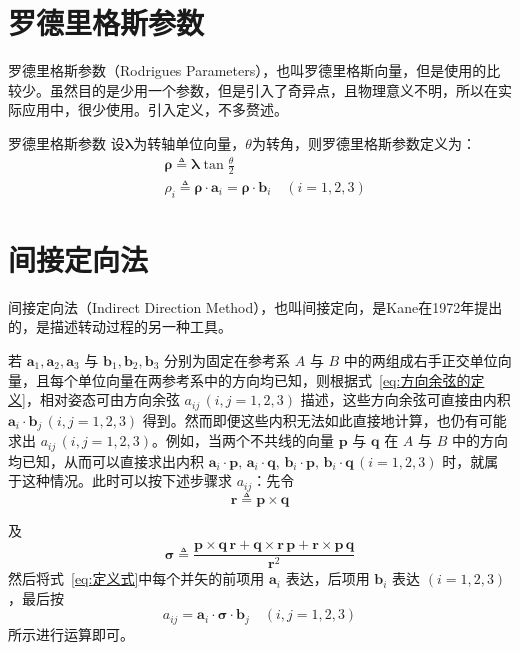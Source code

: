 \section{罗德里格斯参数}
罗德里格斯参数（Rodrigues Parameters），也叫罗德里格斯向量，但是使用的比较少。虽然目的是少用一个参数，但是引入了奇异点，且物理意义不明，所以在实际应用中，很少使用。引入定义，不多赘述。
\begin{mydefinition}{罗德里格斯参数}
    设$\boldsymbol{\lambda}$为转轴单位向量，$\theta$为转角，则罗德里格斯参数定义为：
    \begin{equation}
        \begin{aligned}
            &\boldsymbol{\rho} \triangleq \boldsymbol{\lambda}\tan \frac{\theta}{2}\\
            &\rho_i \triangleq \boldsymbol{\rho} \cdot \boldsymbol{a}_i=\boldsymbol{\rho} \cdot \boldsymbol{b}_i\quad(i=1,2,3)
        \end{aligned}
    \end{equation}
\end{mydefinition}

\section{间接定向法}
间接定向法（Indirect Direction Method），也叫间接定向，是Kane在1972年提出的，是描述转动过程的另一种工具。

若 $\mathbf{a}_1,\mathbf{a}_2,\mathbf{a}_3$ 与 $\mathbf{b}_1,\mathbf{b}_2,\mathbf{b}_3$ 分别为固定在参考系 $A$ 与 $B$ 中的两组成右手正交单位向量，且每个单位向量在两参考系中的方向均已知，则根据式~\eqref{eq:方向余弦的定义}，相对姿态可由方向余弦 $a_{ij}\,(i,j=1,2,3)$ 描述，这些方向余弦可直接由内积 $\mathbf{a}_i\cdot\mathbf{b}_j\,(i,j=1,2,3)$ 得到。然而即便这些内积无法如此直接地计算，也仍有可能求出 $a_{ij}\,(i,j=1,2,3)$。例如，当两个不共线的向量 $\mathbf{p}$ 与 $\mathbf{q}$ 在 $A$ 与 $B$ 中的方向均已知，从而可以直接求出内积 $\mathbf{a}_i\cdot\mathbf{p},\,\mathbf{a}_i\cdot\mathbf{q},\,\mathbf{b}_i\cdot\mathbf{p},\,\mathbf{b}_i\cdot\mathbf{q}\,(i=1,2,3)$ 时，就属于这种情况。此时可以按下述步骤求 $a_{ij}$：先令
\begin{equation}
    \mathbf{r}\triangleq\mathbf{p}\times\mathbf{q}
\end{equation}

及
\begin{equation}
    \boldsymbol{\sigma}\triangleq\frac{\mathbf{p}\times\mathbf{q}\,\mathbf{r}+\mathbf{q}\times\mathbf{r}\,\mathbf{p}+\mathbf{r}\times\mathbf{p}\,\mathbf{q}}{\mathbf{r}^{2}}
    \label{eq:定义式}
\end{equation}
然后将式~\eqref{eq:定义式}中每个并矢的前项用 $\mathbf{a}_i$ 表达，后项用 $\mathbf{b}_i$ 表达 $(i=1,2,3)$，最后按
$$
a_{ij}=\mathbf{a}_i\cdot\boldsymbol{\sigma}\cdot\mathbf{b}_j\quad(i,j=1,2,3)
$$
所示进行运算即可。

